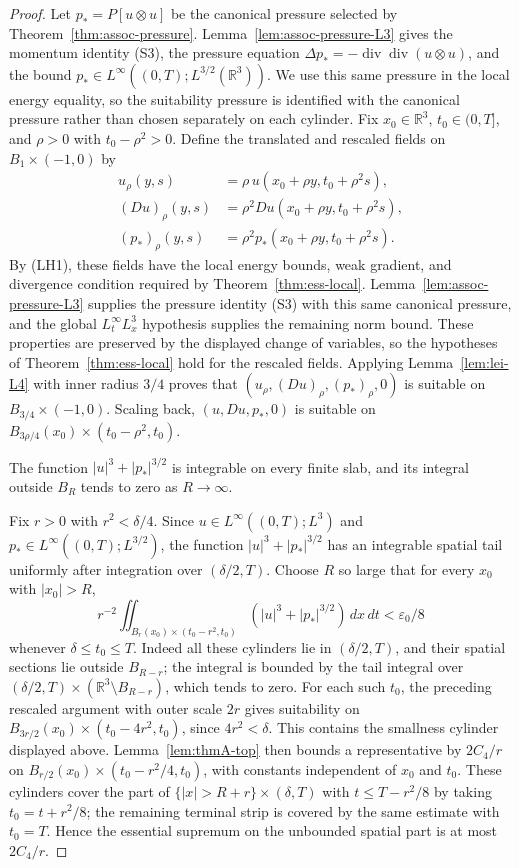 \documentclass[11pt,letterpaper]{article}
\numberwithin{equation}{section}
\theoremstyle{plain}
\theoremstyle{definition}
\theoremstyle{remark}
\begin{document}
\begin{proof}
Let $p_*=P[u\otimes u]$ be the canonical pressure selected by Theorem~\ref{thm:assoc-pressure}. Lemma~\ref{lem:assoc-pressure-L3} gives the momentum identity (S3), the pressure equation $\Delta p_*=-\operatorname{div}\operatorname{div}(u\otimes u)$, and the bound $p_*\in L^\infty((0,T);L^{3/2}(\mathbb R^3))$. We use this same pressure in the local energy equality, so the suitability pressure is identified with the canonical pressure rather than chosen separately on each cylinder. Fix $x_0\in\mathbb R^3$, $t_0\in(0,T]$, and $\rho>0$ with $t_0-\rho^2>0$. Define the translated and rescaled fields on $B_1\times(-1,0)$ by
\begin{align*}
u_\rho(y,s)&=\rho\,u(x_0+\rho y,t_0+\rho^2s),\\
(Du)_\rho(y,s)&=\rho^2Du(x_0+\rho y,t_0+\rho^2s),\\
(p_*)_\rho(y,s)&=\rho^2p_*(x_0+\rho y,t_0+\rho^2s).
\end{align*}
By (LH1), these fields have the local energy bounds, weak gradient, and divergence condition required by Theorem~\ref{thm:ess-local}. Lemma~\ref{lem:assoc-pressure-L3} supplies the pressure identity (S3) with this same canonical pressure, and the global $L^\infty_tL^3_x$ hypothesis supplies the remaining norm bound. These properties are preserved by the displayed change of variables, so the hypotheses of Theorem~\ref{thm:ess-local} hold for the rescaled fields. Applying Lemma~\ref{lem:lei-L4} with inner radius $3/4$ proves that $(u_\rho,(Du)_\rho,(p_*)_\rho,0)$ is suitable on $B_{3/4}\times(-1,0)$. Scaling back, $(u,Du,p_*,0)$ is suitable on $B_{3\rho/4}(x_0)\times(t_0-\rho^2,t_0)$.

The function $|u|^3+|p_*|^{3/2}$ is integrable on every finite slab, and its integral outside $B_R$ tends to zero as $R\to\infty$.

Fix $r>0$ with $r^2<\delta/4$. Since $u\in L^\infty((0,T);L^3)$ and $p_*\in L^\infty((0,T);L^{3/2})$, the function $|u|^3+|p_*|^{3/2}$ has an integrable spatial tail uniformly after integration over $(\delta/2,T)$. Choose $R$ so large that for every $x_0$ with $|x_0|>R$,
\begin{equation*}
r^{-2}\iint_{B_r(x_0)\times(t_0-r^2,t_0)}(|u|^3+|p_*|^{3/2})\,dx\,dt<\varepsilon_0/8
\end{equation*}
whenever $\delta\le t_0\le T$. Indeed all these cylinders lie in $(\delta/2,T)$, and their spatial sections lie outside $B_{R-r}$; the integral is bounded by the tail integral over $(\delta/2,T)\times(\mathbb R^3\setminus B_{R-r})$, which tends to zero.
For each such $t_0$, the preceding rescaled argument with outer scale $2r$ gives suitability on $B_{3r/2}(x_0)\times(t_0-4r^2,t_0)$, since $4r^2<\delta$. This contains the smallness cylinder displayed above. Lemma~\ref{lem:thmA-top} then bounds a representative by $2C_4/r$ on $B_{r/2}(x_0)\times(t_0-r^2/4,t_0)$, with constants independent of $x_0$ and $t_0$. These cylinders cover the part of $\{|x|>R+r\}\times(\delta,T)$ with $t\le T-r^2/8$ by taking $t_0=t+r^2/8$; the remaining terminal strip is covered by the same estimate with $t_0=T$. Hence the essential supremum on the unbounded spatial part is at most $2C_4/r$.


\end{proof}
\end{document}
